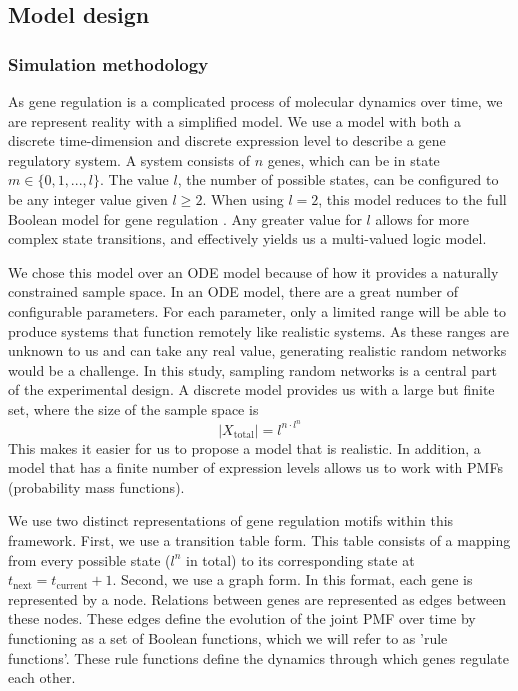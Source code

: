 \documentclass[../main.tex]{subfiles}
\begin{document}
\subsection{Model design}

\subsubsection{Simulation methodology}

As gene regulation is a complicated process of molecular dynamics over time, we are represent reality with a simplified model.
We use a model with both a discrete time-dimension and discrete expression level to describe a gene regulatory system.
A system consists of $n$ genes, which can be in state $m \in \{0, 1, ..., l\}$.
The value $l$, the number of possible states, can be configured to be any integer value given $l \ge 2$.
When using $l = 2$, this model reduces to the full Boolean model for gene regulation \cite{bolouri2002modeling}.
Any greater value for $l$ allows for more complex state transitions, and effectively yields us a multi-valued logic model.

We chose this model over an ODE model because of how it provides a naturally constrained sample space.
In an ODE model, there are a great number of configurable parameters.
For each parameter, only a limited range will be able to produce systems that function remotely like realistic systems.
As these ranges are unknown to us and can take any real value, generating realistic random networks would be a challenge.
In this study, sampling random networks is a central part of the experimental design.
A discrete model provides us with a large but finite set, where the size of the sample space is
%
\begin{equation}
|X_\mathrm{total}| = l^{n \cdot l^n}
\end{equation}
%
This makes it easier for us to propose a model that is realistic.
In addition, a model that has a finite number of expression levels allows us to work with PMFs (probability mass functions).

We use two distinct representations of gene regulation motifs within this framework.
First, we use a transition table form.
This table consists of a mapping from every possible state ($l^n$ in total) to its corresponding state at $t_\mathrm{next} = t_\mathrm{current} + 1$.
Second, we use a graph form.
In this format, each gene is represented by a node.
Relations between genes are represented as edges between these nodes.
These edges define the evolution of the joint PMF over time by functioning as a set of Boolean functions, which we will refer to as 'rule functions'.
These rule functions define the dynamics through which genes regulate each other.
\end{document}
